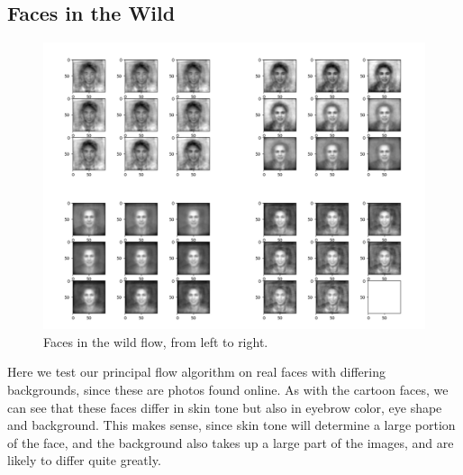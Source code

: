 \documentclass[12pt]{report}
\begin{document}
\begin{appendices}
\section{Faces in the Wild}
\begin{figure}[ht]
    \begin{center}
        \includegraphics[scale=0.3]{main_lfw_10_05.png}
        \caption{Faces in the wild flow, from left to right.}
        \label{fig:Facesinthewildflows}
    \end{center}
\end{figure}
Here we test our principal flow algorithm on real faces with differing backgrounds, 
since these are photos found online. As with the cartoon faces, we can see that
these faces differ in skin tone but also in eyebrow color, eye shape and background. 
This makes sense, since skin tone will determine a large portion of the face,
and the background also takes up a large part of the images, and are likely to differ 
quite greatly.
\end{appendices}
\end{document}
